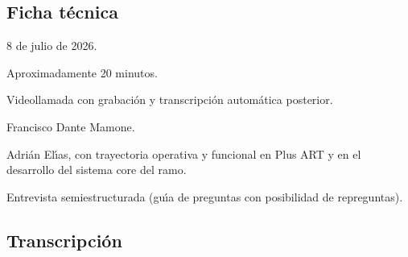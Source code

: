 \label{anexo:entrevista-adrian-elias}

\subsection*{Ficha t\'ecnica}

\begin{description}[style=nextline, leftmargin=3.2cm, labelwidth=2.8cm]
	\item[Fecha] 8 de julio de 2026.
	\item[Duraci\'on] Aproximadamente 20 minutos.
	\item[Modalidad] Videollamada con grabaci\'on y transcripci\'on autom\'atica posterior.
	\item[Entrevistador] Francisco Dante Mamone.
	\item[Entrevistado] Adri\'an El\'{\i}as, con trayectoria operativa y funcional en Plus ART y en el desarrollo del sistema core del ramo.
	\item[Tipo] Entrevista semiestructurada (gu\'{\i}a de preguntas con posibilidad de repreguntas).
\end{description}

\subsection*{Transcripci\'on}

